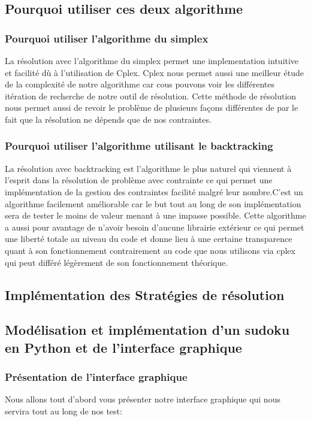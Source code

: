 \subsection{Pourquoi utiliser ces deux algorithme}

\subsubsection{Pourquoi utiliser l'algorithme du simplex}

La résolution avec l'algorithme du simplex permet une implementation intuitive et facilité dù à l'utilisation de Cplex. Cplex nous permet aussi une meilleur étude de la complexité de notre algorithme car cous pouvons voir les différentes itération de recherche de notre outil de résolution. Cette méthode de résolution nous permet aussi de revoir le problème de plusieurs façons différentes de par le fait que la résolution ne dépends que de nos contraintes.

\subsubsection{Pourquoi utiliser l'algorithme utilisant le backtracking}

La résolution avec backtracking est l'algorithme le plus naturel qui viennent à l'esprit dans la résolution de problème avec contrainte ce qui permet une implémentation de la gestion des contraintes facilité malgré leur nombre.C'est un algorithme facilement améliorable car le but tout au long de son implémentation sera de tester le moins de valeur menant à une impasse possible. Cette algorithme a aussi pour avantage de n'avoir besoin d'aucune librairie extérieur ce qui permet une liberté totale au niveau du code et donne lieu à une certaine transparence quant à son fonctionnement contrairement au code que nous utilisons via cplex qui peut différé légèrement de son fonctionnement théorique.\newpage

\subsection{Implémentation des Stratégies de résolution}

\subsection{Modélisation et implémentation d'un sudoku en Python et de l'interface graphique}

\subsubsection{Présentation de l'interface graphique}
Nous allons tout d'abord vous présenter notre interface graphique qui nous servira tout au long de nos test:\newline

